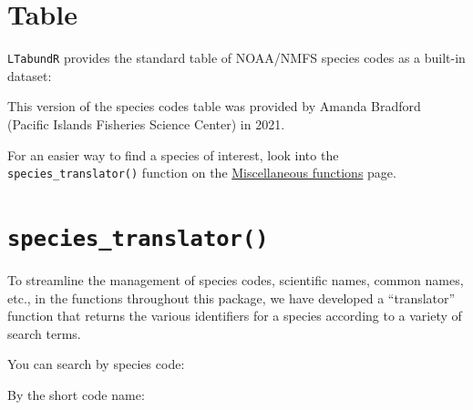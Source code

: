 \documentclass[
]{book}
\newenvironment{Shaded}{\begin{snugshade}}{\end{snugshade}}
\newcommand{\CommentTok}[1]{\textcolor[rgb]{0.56,0.35,0.01}{\textit{#1}}}
\newcommand{\DataTypeTok}[1]{\textcolor[rgb]{0.13,0.29,0.53}{#1}}
\newcommand{\DecValTok}[1]{\textcolor[rgb]{0.00,0.00,0.81}{#1}}
\newcommand{\KeywordTok}[1]{\textcolor[rgb]{0.13,0.29,0.53}{\textbf{#1}}}
\newcommand{\NormalTok}[1]{#1}
\newcommand{\OperatorTok}[1]{\textcolor[rgb]{0.81,0.36,0.00}{\textbf{#1}}}
\newcommand{\StringTok}[1]{\textcolor[rgb]{0.31,0.60,0.02}{#1}}
\begin{document}
\hypertarget{table}{%
\section*{Table}\label{table}}

\texttt{LTabundR} provides the standard table of NOAA/NMFS species codes as a built-in dataset:

This version of the species codes table was provided by Amanda Bradford (Pacific Islands Fisheries Science Center) in 2021.

For an easier way to find a species of interest, look into the \texttt{species\_translator()} function on the \protect\hyperlink{misc_functions}{Miscellaneous functions} page.

\hypertarget{species_translator}{%
\section*{\texorpdfstring{\texttt{species\_translator()}}{species\_translator()}}\label{species_translator}}

To streamline the management of species codes, scientific names, common names, etc., in the functions throughout this package, we have developed a ``translator'' function that returns the various identifiers for a species according to a variety of search terms.

You can search by species code:

\begin{Shaded}
\end{Shaded}

By the short code name:
\end{document}
